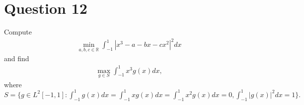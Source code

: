 \section{Question 12}
\horz
Compute 
\begin{align*}
\min_{a,b,c \in\mathbb R} \int_{-1}^1|x^3-a-bx-cx^2|^2 dx
\end{align*}
and find 
\begin{align*}
\max_{g\in S} \int_{-1}^1 x^3g(x) dx,
\end{align*}
where $S= \bigg\{g\in L^2[-1,1] : \int_{-1}^{1} g(x)dx= \int_{-1}^{1} xg(x)dx = \int_{-1}^{1} x^2g(x)dx =0, \int_{-1}^{1} |g(x)|^2dx=1 \bigg\}.$
\horz
